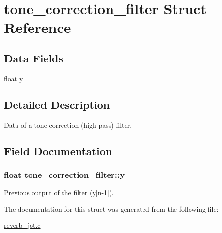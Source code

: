 \hypertarget{structtone__correction__filter}{\section{tone\-\_\-correction\-\_\-filter Struct Reference}
\label{structtone__correction__filter}
}
\subsection*{Data Fields}
\begin{DoxyCompactItemize}
\item 
float \hyperlink{structtone__correction__filter_a33336212375a5062fd1b8d76a102c373}{y}
\end{DoxyCompactItemize}


\subsection{Detailed Description}
Data of a tone correction (high pass) filter. 

\subsection{Field Documentation}
\hypertarget{structtone__correction__filter_a33336212375a5062fd1b8d76a102c373}{
\subsubsection[{y}]{\setlength{\rightskip}{0pt plus 5cm}float tone\-\_\-correction\-\_\-filter\-::y}}\label{structtone__correction__filter_a33336212375a5062fd1b8d76a102c373}
Previous output of the filter (y\mbox{[}n-\/1\mbox{]}). 

The documentation for this struct was generated from the following file\-:\begin{DoxyCompactItemize}
\item 
\hyperlink{reverb__jot_8c}{reverb\-\_\-jot.\-c}\end{DoxyCompactItemize}
